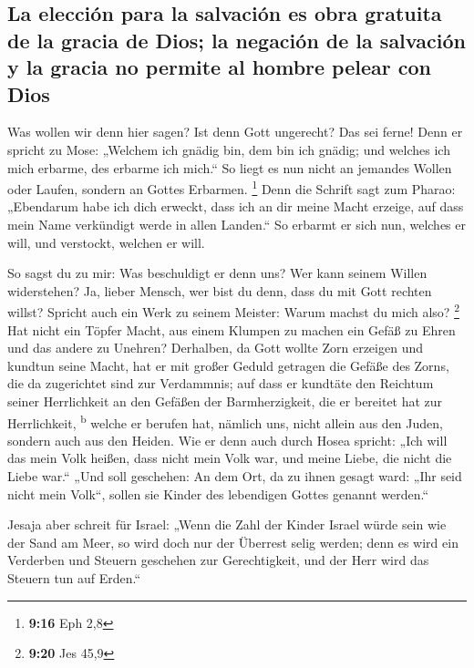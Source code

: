 \hypertarget{la-elecciuxf3n-para-la-salvaciuxf3n-es-obra-gratuita-de-la-gracia-de-dios-la-negaciuxf3n-de-la-salvaciuxf3n-y-la-gracia-no-permite-al-hombre-pelear-con-dios}{%
\subsection{La elección para la salvación es obra gratuita de la gracia
de Dios; la negación de la salvación y la gracia no permite al hombre
pelear con
Dios}\label{la-elecciuxf3n-para-la-salvaciuxf3n-es-obra-gratuita-de-la-gracia-de-dios-la-negaciuxf3n-de-la-salvaciuxf3n-y-la-gracia-no-permite-al-hombre-pelear-con-dios}}

 Was wollen wir denn hier sagen? Ist denn Gott ungerecht?
Das sei ferne!  Denn er spricht zu Mose: „Welchem ich
gnädig bin, dem bin ich gnädig; und welches ich mich erbarme, des
erbarme ich mich.``  So liegt es nun nicht an jemandes
Wollen oder Laufen, sondern an Gottes Erbarmen. \footnote{\textbf{9:16}
  Eph 2,8}  Denn die Schrift sagt zum Pharao: „Ebendarum
habe ich dich erweckt, dass ich an dir meine Macht erzeige, auf dass
mein Name verkündigt werde in allen Landen.``  So erbarmt
er sich nun, welches er will, und verstockt, welchen er will.

 So sagst du zu mir: Was beschuldigt er denn uns? Wer
kann seinem Willen widerstehen?  Ja, lieber Mensch, wer
bist du denn, dass du mit Gott rechten willst? Spricht auch ein Werk zu
seinem Meister: Warum machst du mich also? \footnote{\textbf{9:20} Jes
  45,9}  Hat nicht ein Töpfer Macht, aus einem Klumpen zu
machen ein Gefäß zu Ehren und das andere zu Unehren? 
Derhalben, da Gott wollte Zorn erzeigen und kundtun seine Macht, hat er
mit großer Geduld getragen die Gefäße des Zorns, die da zugerichtet sind
zur Verdammnis;  auf dass er kundtäte den Reichtum seiner
Herrlichkeit an den Gefäßen der Barmherzigkeit, die er bereitet hat zur
Herrlichkeit, \textsuperscript{b}  welche er berufen hat,
nämlich uns, nicht allein aus den Juden, sondern auch aus den Heiden.
 Wie er denn auch durch Hosea spricht: „Ich will das mein
Volk heißen, dass nicht mein Volk war, und meine Liebe, die nicht die
Liebe war.``  „Und soll geschehen: An dem Ort, da zu
ihnen gesagt ward: „Ihr seid nicht mein Volk``, sollen sie Kinder des
lebendigen Gottes genannt werden.``

 Jesaja aber schreit für Israel: „Wenn die Zahl der
Kinder Israel würde sein wie der Sand am Meer, so wird doch nur der
Überrest selig werden;  denn es wird ein Verderben und
Steuern geschehen zur Gerechtigkeit, und der Herr wird das Steuern tun
auf Erden.``

